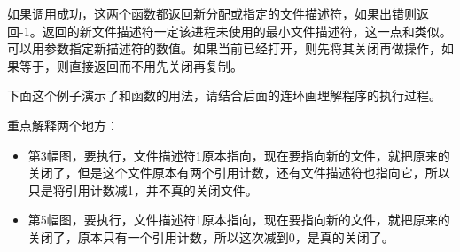 

如果调用成功，这两个函数都返回新分配或指定的文件描述符，如果出错则返回-1。返回的新文件描述符一定该进程未使用的最小文件描述符，这一点和类似。可以用参数指定新描述符的数值。如果当前已经打开，则先将其关闭再做操作，如果等于，则直接返回而不用先关闭再复制。



下面这个例子演示了和函数的用法，请结合后面的连环画理解程序的执行过程。






重点解释两个地方：


\begin{itemize}

\item 第3幅图，要执行，文件描述符1原本指向，现在要指向新的文件，就把原来的关闭了，但是这个文件原本有两个引用计数，还有文件描述符也指向它，所以只是将引用计数减1，并不真的关闭文件。

\item 第5幅图，要执行，文件描述符1原本指向，现在要指向新的文件，就把原来的关闭了，原本只有一个引用计数，所以这次减到0，是真的关闭了。
\end{itemize}

